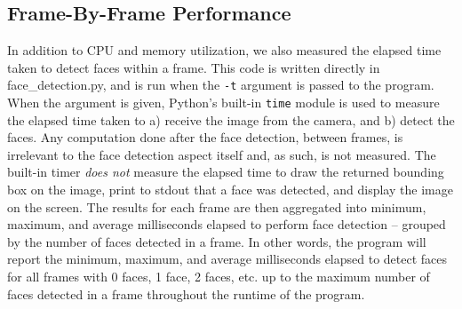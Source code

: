 \documentclass[conference]{IEEEtran}
\begin{document}
\subsection{Frame-By-Frame Performance}
In addition to CPU and memory utilization, we also measured the elapsed time taken to detect faces within a frame. This code is written directly in face\_detection.py, and is run when the \texttt{-t} argument is passed to the program. When the argument is given, Python's built-in \texttt{time} module is used to measure the elapsed time taken to a) receive the image from the camera, and b) detect the faces. Any computation done after the face detection, between frames, is irrelevant to the face detection aspect itself and, as such, is not measured. The built-in timer \emph{does not} measure the elapsed time to  draw the returned bounding box on the image, print to stdout that a face was detected, and display the image on the screen. The results for each frame are then aggregated into minimum, maximum, and average milliseconds elapsed to perform face detection -- grouped by the number of faces detected in a frame. In other words, the program will report the minimum, maximum, and average milliseconds elapsed to detect faces for all frames with 0 faces, 1 face, 2 faces, etc. up to the maximum number of faces detected in a frame throughout the runtime of the program.
\end{document}
